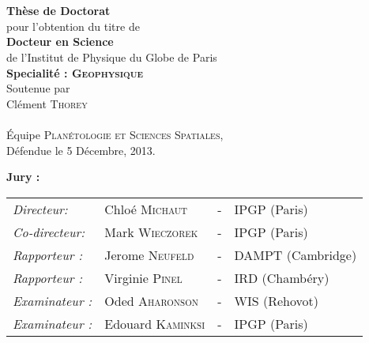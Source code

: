 \begin{titlepage}
\begin{center}
 \\
\vspace*{0.3cm}
 \\
\vspace*{0.5cm}
\noindent \Huge \textbf{Thèse de Doctorat} \\
\vspace*{0.3cm}
\noindent \large {pour l'obtention du titre de} \\
\vspace*{0.3cm}
\noindent \LARGE \textbf{Docteur en Science} \\
\vspace*{0.3cm}
\noindent \Large de l'Institut de Physique du Globe de Paris \\
\noindent \Large \textbf{Specialité : \textsc{Geophysique}}\\
\vspace*{0.4cm}
\noindent \large {Soutenue par\\}
\noindent \LARGE Cl\'ement \textsc{Thorey} \\
\vspace*{0.8cm}
 \\
\vspace*{0.8cm}
\noindent \Large \'Equipe \textsc{Plan\'etologie et Sciences Spatiales},\\
\vspace*{0.2cm}
\noindent \large Défendue le 5 Décembre, 2013. \\
\vspace*{0.5cm}
\end{center}
\noindent \large \textbf{Jury :} \\
\begin{center}
\noindent \large 
\begin{tabular}{llcl}
  \textit{Directeur:} & Chlo\'e \textsc{Michaut} & - & IPGP (Paris) \\
  \textit{Co-directeur:}  & Mark  \textsc{Wieczorek}  &  - &  IPGP (Paris) \\
  \textit{Rapporteur :} &Jerome \textsc{Neufeld} & -& DAMPT (Cambridge)\\
  \textit{Rapporteur :} & Virginie \textsc{Pinel} & - & IRD (Chambéry)\\
  \textit{Examinateur :} & Oded \textsc{Aharonson} & - & WIS (Rehovot)\\
  \textit{Examinateur :} & Edouard \textsc{Kaminksi}& - & IPGP (Paris)
\end{tabular} 


\end{center}
\end{titlepage}

